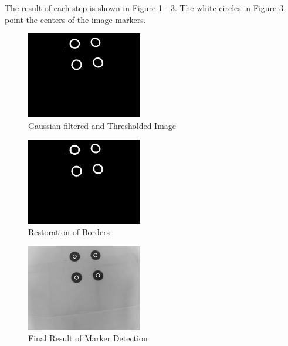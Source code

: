 The result of each step is shown in Figure \ref{fig:threshold} - \ref{fig:result}. The white circles in Figure \ref{fig:result} point the centers of the image markers.

\begin{figure}
    \centering
    \includegraphics[width=0.45\textwidth]{graphics/threshold.png}
    \caption{Gaussian-filtered and Thresholded Image}
    \label{fig:threshold}
\end{figure}

\begin{figure}
    \centering
    \includegraphics[width=0.45\textwidth]{graphics/contour.png}
    \caption{Restoration of Borders}
    \label{fig:contour}
\end{figure}


\begin{figure}
    \centering
    \includegraphics[width=0.45\textwidth]{graphics/result.png}
    \caption{Final Result of Marker Detection}
    \label{fig:result}
\end{figure}


